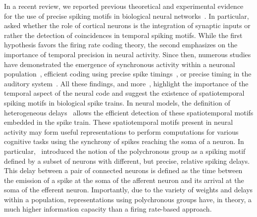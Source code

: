 \documentclass[default]{sn-jnl}%
\theoremstyle{thmstyleone}%
\theoremstyle{thmstyletwo}%
\theoremstyle{thmstylethree}%
\begin{document}
In a recent review, we reported previous theoretical and  experimental evidence for the use of precise spiking motifs in biological neural networks~\cite{grimaldi_precise_2023}. In particular, \citet{abeles_role_1982} asked whether the role of cortical neurons is the integration of synaptic inputs or rather the detection of coincidences in temporal spiking motifs. While the first hypothesis favors the firing rate coding theory, the second emphasizes on the importance of temporal precision in neural activity. Since then, numerous studies have demonstrated the emergence of synchronous activity within a neuronal population~\citep{riehle_spike_1997, davis_spontaneous_2021}, efficient coding using precise spike timings~\citep{Perrinet2002,perrinet_coding_2004, gollisch_rapid_2008}, or precise timing in the auditory system~\citep{deweese_binary_2002, carr_circuit_1990}. All these findings, and more~\citep{bohte_evidence_2004}, highlight the importance of the temporal aspect of the neural code and suggest the existence of spatiotemporal spiking motifs in biological spike trains. In neural models, the definition of heterogeneous delays~\citep{guise_bayesian_2014, zhang_supervised_2020, nadafian_bio-plausible_2020} allows the efficient detection of these spatiotemporal motifs embedded in the spike train. These spatiotemporal motifs present in neural activity may form useful representations to perform computations for various cognitive tasks using the synchrony of spikes reaching the soma of a neuron. In particular,~\citet{izhikevich_polychronization_2006} introduced the notion of the polychronous group as a spiking motif defined by a subset of neurons with different, but precise, relative spiking delays. This delay between a pair of connected neurons is defined as the time between the emission of a spike at the soma of the afferent neuron and its arrival at the soma of the efferent neuron. Importantly, due to the variety of weights and delays within a population, representations using polychronous groups have, in theory, a much higher information capacity than a firing rate-based approach.
\end{document}

